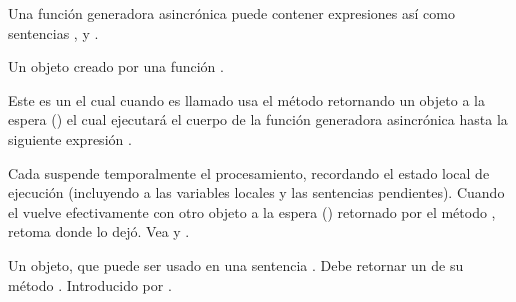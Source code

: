 \documentclass[a4,10pt,spanish]{sphinxmanual}
\begin{document}
\begin{description}
\sphinxAtStartPar
Una función generadora asincrónica puede contener expresiones  así como sentencias , y .

\item[{iterador generador asincrónico\index{iterador generador asincrónico@\spxentry{iterador generador asincrónico}|spxpagem}\phantomsection\label{\detokenize{glossary:term-asynchronous-generator-iterator}}}] \leavevmode
\sphinxAtStartPar
Un objeto creado por una función {\hyperref[\detokenize{glossary:term-asynchronous-generator}]{}}.

\sphinxAtStartPar
Este es un {\hyperref[\detokenize{glossary:term-asynchronous-iterator}]{}} el cual cuando es llamado usa el método   retornando un objeto a la espera () el cual ejecutará el cuerpo de la función generadora asincrónica hasta la siguiente expresión .

\sphinxAtStartPar
Cada  suspende temporalmente el procesamiento, recordando el estado local de ejecución (incluyendo a las variables locales y las sentencias  pendientes). Cuando el  vuelve efectivamente con otro objeto a la espera () retornado por el método  , retoma donde lo dejó. Vea  y .

\item[{iterable asincrónico\index{iterable asincrónico@\spxentry{iterable asincrónico}|spxpagem}\phantomsection\label{\detokenize{glossary:term-asynchronous-iterable}}}] \leavevmode
\sphinxAtStartPar
Un objeto, que puede ser usado en una sentencia . Debe retornar un {\hyperref[\detokenize{glossary:term-asynchronous-iterator}]{}} de su método . Introducido por .


\end{description}
\end{document}
